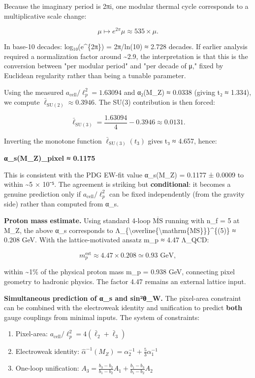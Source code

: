 Because the imaginary period is 2πi, one modular thermal cycle corresponds to a multiplicative scale change:

\[
\mu \mapsto e^{2\pi} \mu \approx 535 \times \mu.
\]

In base-10 decades: log₁₀(e\^{}\{2π\}) = 2π/ln(10) ≈ 2.728 decades. If earlier analysis required a normalization factor around \textasciitilde2.9, the interpretation is that this is the conversion between "per modular period" and "per decade of μ," fixed by Euclidean regularity rather than being a tunable parameter.

Using the measured \(a_{\mathrm{cell}}/\ell_p^2 = 1.63094\) and α₂(M\_Z) ≈ 0.0338 (giving t₂ ≈ 1.334), we compute \(\bar{\ell}_{\mathrm{SU}(2)} ≈ 0.3946\). The SU(3) contribution is then forced:

\[
\bar{\ell}_{\mathrm{SU}(3)} = \frac{1.63094}{4} - 0.3946 \approx 0.0131.
\]

Inverting the monotone function \(\bar{\ell}_{\mathrm{SU}(3)}(t_3)\) gives t₃ ≈ 4.657, hence:

\textbf{α\_s(M\_Z)\textbar\_pixel ≈ 0.1175}

This is consistent with the PDG EW-fit value α\_s(M\_Z) = 0.1177 ± 0.0009 to within \textasciitilde5 × 10⁻⁵. The agreement is striking but \textbf{conditional}: it becomes a genuine prediction only if \(a_{\mathrm{cell}}/\ell_p^2\) can be fixed independently (from the gravity side) rather than computed from α\_s.

\textbf{Proton mass estimate.} Using standard 4-loop \(\overline{\mathrm{MS}}\) running with n\_f = 5 at M\_Z, the above α\_s corresponds to Λ\_\{\textbackslash overline\{\textbackslash mathrm\{MS\}\}\}\^{}\{(5)\} ≈ 0.208 GeV. With the lattice-motivated ansatz m\_p ≈ 4.47 Λ\_QCD:

\[
m_p^{\mathrm{est}} \approx 4.47 \times 0.208 \simeq 0.93 \text{ GeV},
\]

within \textasciitilde1\% of the physical proton mass m\_p = 0.938 GeV, connecting pixel geometry to hadronic physics. The factor 4.47 remains an external lattice input.

\textbf{Simultaneous prediction of α\_s and sin²θ\_W.} The pixel-area constraint can be combined with the electroweak identity and unification to predict \textbf{both} gauge couplings from minimal inputs. The system of constraints:

\begin{enumerate}
\def\labelenumi{\arabic{enumi}.}
\tightlist
\item
  Pixel-area: \(a_{\mathrm{cell}}/\ell_p^2 = 4(\bar{\ell}_2 + \bar{\ell}_3)\)
\item
  Electroweak identity: \(\hat{\alpha}^{-1}(M_Z) = \alpha_2^{-1} + \frac{5}{3}\alpha_1^{-1}\)
\item
  One-loop unification: \(A_3 = \frac{b_3-b_2}{b_1-b_2}A_1 + \frac{b_1-b_3}{b_1-b_2}A_2\)
\end{enumerate}

